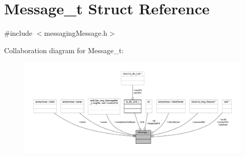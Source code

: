 \hypertarget{struct_message__t}{}\section{Message\+\_\+t Struct Reference}
\label{struct_message__t}


{\ttfamily \#include $<$messaging\+Message.\+h$>$}



Collaboration diagram for Message\+\_\+t\+:
\nopagebreak
\begin{figure}[H]
\begin{center}
\leavevmode
\includegraphics[width=350pt]{struct_message__t__coll__graph}
\end{center}
\end{figure}
